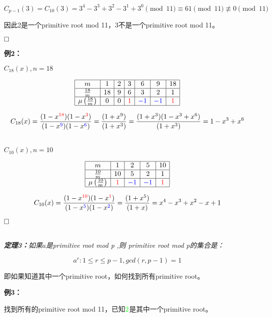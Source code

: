 \documentclass{article}
\begin{document}
$$C_{p-1}(3) = C_{10}(3) = 3^4- 3^3 +3^2-3^1+3^0 \pmod{11} \equiv 61 \pmod{11} \not\equiv 0 \pmod{11}$$


因此2是一个{\color{red}primitive root mod 11}，3不是一个{\color{red}primitive root mod 11}。

$\hfill\square$ 


\textbf{例2：}


$C_{18}(x), n = 18$

$$
\begin{array}{|c|c|c|c|c|c|c|}
\hline 
m & 1 & 2& 3 &6&9&18 \\
\hline 
\frac{18}{m} &18&9&6&3&2&1  \\
\hline 
\mu\left(\frac{18}{m} \right) &0&0&{\color{red}1}&{\color{blue}-1}&{\color{blue}-1}&{\color{red}1} \\
\hline
\end{array}
$$

$$C_{18}(x) =\frac{(1-x^{{\color{red}18}})(1-x^{{\color{red}3}})}{(1-x^{{\color{blue}9}})(1-x^{{\color{blue}6}})} = \frac{(1+x^{9})}{(1+x^3)} =\frac{(1+x^{3})(1-x^{3}+x^{6})}{(1+x^3)}  = 1 - x^3+x^6$$

~\\

$C_{10}(x), n = 10$

$$
\begin{array}{|c|c|c|c|c|}
\hline 
m & 1 & 2& 5&10\\
\hline 
\frac{10}{m} &10&5&2&1\\
\hline 
\mu\left(\frac{10}{m} \right) &{\color{red}1}&{\color{blue}-1}&{\color{blue}-1}&{\color{red}1}\\
\hline
\end{array}
$$

$$C_{10}(x) =\frac{(1-x^{{\color{red}10}})(1-x^{{\color{red}1}})}{(1-x^{{\color{blue}5}})(1-x^{{\color{blue}2}})} = \frac{(1+x^{5})}{(1+x)} =x^4-x^3+x^2-x+1$$



$\hfill\square$ 

~\\

\textit{\textbf{定理3：}如果$a$是{\color{red}primitive root mod p} ,则 {\color{red}primitive root mod p}的集合是：}

$${a^r :1 \leq  r \leq p-1, gcd(r,p-1) = 1}$$

即如果知道其中一个primitive root，如何找到所有primitive root。

\textbf{例3：}


找到所有的primitive root mod 11，已知${\color{green}2}$是其中一个primitive root。
\end{document}
